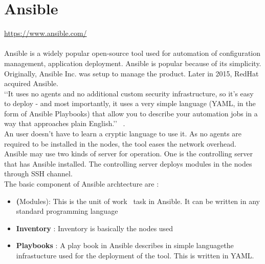 \section{Ansible}
\url{ https://www.ansible.com/ } \\
\\
Ansible is a widely popular open-source tool used for automation of configuration management,
application deployment. Ansible is popular because of its simplicity. Originally, Ansible Inc.
was setup to manage the product. Later in 2015, RedHat acquired Ansible.\\
‘‘It uses no agents and no additional custom security infrastructure, so it’s easy to deploy - 
and most importantly, it uses a very simple language (YAML, in the form of Ansible Playbooks) 
that allow you to describe your automation jobs in a way that approaches plain English.’’
~\cite {hid-sp18-417-doc-Ansible}. \\
An user doesn’t have to learn a cryptic language to use it. 
As no agents are required to be installed in the nodes, the tool eases the network overhead. \\
Ansible may use two kinds of server for operation. One is the controlling server that has Ansible installed.
The controlling server deploys modules in the nodes through SSH channel. \\
The basic component of Ansible archtecture are : \\
\begin{itemize}
\item       \textbf(Modules): This is the unit of work \ task in Ansible. It can be written in any standard programming language
\item       \textbf{Inventory} : Inventory is basically the nodes used
\item       \textbf{Playbooks} : A play book in Ansible describes in simple languagethe 
infrastucture used for the deployment of the tool. This is written in YAML.
\end{itemize}


